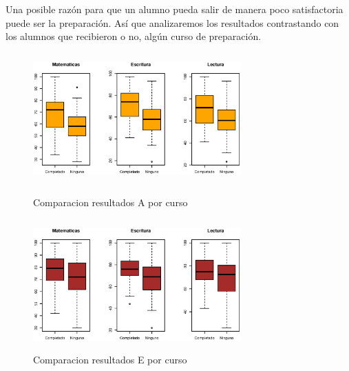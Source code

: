 \documentclass{article}
\begin{document}
    Una posible raz\'on para que un alumno pueda salir de manera poco satisfactoria puede ser la preparaci\'on. As\'i que analizaremos
    los resultados contrastando con los alumnos que recibieron o no, alg\'un curso de preparaci\'on.


    \begin{figure}[H]
        \begin{minipage}[b]{0.45\linewidth}
            \includegraphics[width=8cm,height = 5cm]{Output/Plots/7DesempenogrupoACurso.eps}
            \vspace*{-8.5mm}
            \caption{Comparacion resultados A por curso}
            \label{fig:minipage1}
        \end{minipage}
        \hspace{0.2cm}
        \begin{minipage}[b]{0.45\linewidth}
            \includegraphics[width=8cm,height = 5cm]{Output/Plots/8DesempenogrupoECurso.eps}
            \vspace*{-9mm}
            \caption{Comparacion resultados E por curso}
            \label{fig:minipage2}
        \end{minipage}
    \end{figure}
\end{document}
